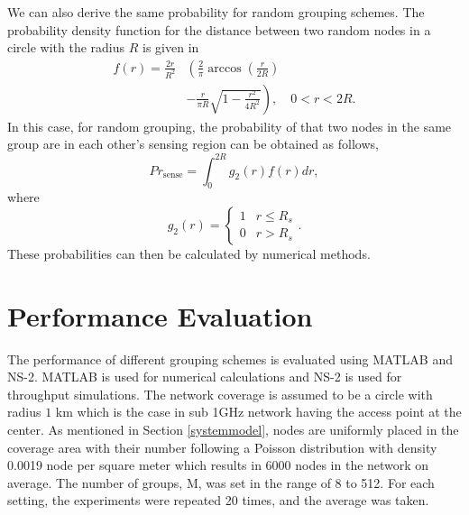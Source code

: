 We can also derive the same probability for random grouping schemes. The probability density function for the distance between two random nodes in a circle with the radius $R$ is given in \cite{moltchanov2012distance}
\begin{equation}
\begin{split}
f(r)=\frac{2r}{R^2} & \left( \frac{2}{\pi}\arccos(\frac{r}{2R}) \right. \\
& \left.  - \frac{r}{\pi R} \sqrt{1- \frac{r^2}{4R^2}} \right ) ,\quad 0<r<2R.
\end{split}
\end{equation}
In this case, for random grouping, the probability of that two nodes in the same group are in each other's sensing region can be obtained as follows,
\begin{equation}
Pr_{\text{sense}}=\int_0^{2R}g_2(r)f(r)dr,
\end{equation}
where
\begin{equation}
g_2(r)=
\begin{cases} 
      1 & r \leq R_s \\
      0 & r > R_s
   \end{cases}.
\end{equation}
These probabilities can then be calculated by numerical methods.




\section{Performance Evaluation}


The performance of different grouping schemes is evaluated using MATLAB and NS-2\cite{breslau2000advances}. MATLAB is used for numerical calculations and NS-2 is used for throughput simulations. The network coverage is assumed to be a circle with radius $1$ km which is the case in sub 1GHz network having the access point at the center. As mentioned in Section \ref{systemmodel}, nodes are uniformly placed in the coverage area with their number following a Poisson distribution with density 0.0019 node per square meter which results in 6000 nodes in the network on average. The number of groups, M, was set in the range of 8 to 512. For each setting, the experiments were repeated 20 times, and the average was taken. 


